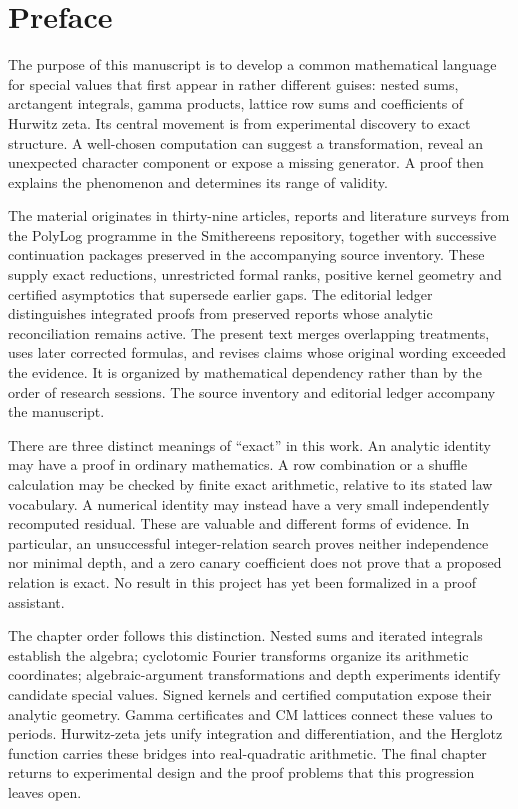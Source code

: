 

\pagestyle{plain}
\frontmatter
\maketitle
\chapter*{Preface}
The purpose of this manuscript is to develop a common mathematical language
for special values that first appear in rather different guises: nested sums,
arctangent integrals, gamma products, lattice row sums and coefficients of
Hurwitz zeta. Its central movement is from experimental discovery to exact
structure. A well-chosen computation can suggest a transformation, reveal an
unexpected character component or expose a missing generator. A proof then
explains the phenomenon and determines its range of validity.

The material originates in thirty-nine articles, reports and literature
surveys from the PolyLog programme in the Smithereens repository, together
with successive continuation packages preserved in the accompanying source
inventory. These supply exact reductions, unrestricted formal ranks, positive
kernel geometry and certified asymptotics that supersede earlier gaps.
The editorial ledger distinguishes integrated proofs from preserved reports
whose analytic reconciliation remains active.
The present
text merges overlapping treatments, uses later corrected formulas, and
revises claims whose original wording exceeded the evidence. It is organized
by mathematical dependency rather than by the order of research sessions.
The source inventory and editorial ledger accompany the manuscript.

There are three distinct meanings of ``exact'' in this work. An analytic
identity may have a proof in ordinary mathematics. A row combination or a
shuffle calculation may be checked by finite exact arithmetic, relative to
its stated law vocabulary. A numerical identity may instead have a very
small independently recomputed residual. These are valuable and different
forms of evidence. In particular, an unsuccessful integer-relation search
proves neither independence nor minimal depth, and a zero canary coefficient
does not prove that a proposed relation is exact. No result in this project
has yet been formalized in a proof assistant.

The chapter order follows this distinction. Nested sums and iterated
integrals establish the algebra; cyclotomic Fourier transforms organize its
arithmetic coordinates; algebraic-argument transformations and depth
experiments identify candidate special values. Signed kernels and certified
computation expose their analytic geometry. Gamma certificates and CM
lattices connect these values to periods. Hurwitz-zeta jets unify integration
and differentiation, and the Herglotz function carries these bridges into
real-quadratic arithmetic. The final chapter returns to experimental design
and the proof problems that this progression leaves open.

